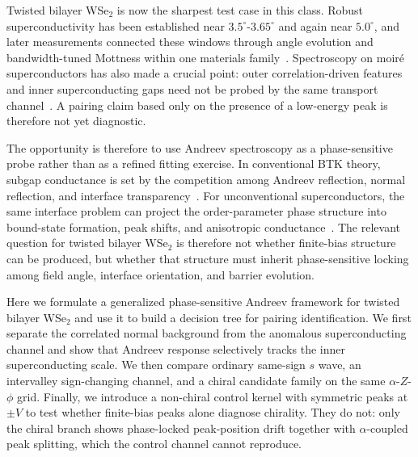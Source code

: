 \documentclass[aps,prl,twocolumn,superscriptaddress,longbibliography]{revtex4-2}
\begin{document}
Twisted bilayer WSe$_2$ is now the sharpest test case in this class. Robust
superconductivity has been established near $3.5^\circ$-$3.65^\circ$ and again
near $5.0^\circ$, and later measurements connected these windows through angle
evolution and bandwidth-tuned Mottness within one materials
family~\cite{Xia2025SC,Hone2025SC5,Angle2026,Bandwidth2026}. Spectroscopy on
moir\'e superconductors has also made a crucial point: outer correlation-driven
features and inner superconducting gaps need not be probed by the same
transport channel~\cite{Kim2026Intervalley}. A pairing claim based only on the
presence of a low-energy peak is therefore not yet diagnostic.

The opportunity is therefore to use Andreev spectroscopy as a phase-sensitive
probe rather than as a refined fitting exercise. In conventional BTK theory,
subgap conductance is set by the competition among Andreev reflection, normal
reflection, and interface transparency~\cite{BTK1982,Octavio1983,Beenakker1997}.
For unconventional superconductors, the same interface problem can project the
order-parameter phase structure into bound-state formation, peak shifts, and
anisotropic conductance~\cite{Hu1994,TanakaKashiwaya1995,KashiwayaTanaka2000,Linder2010,Wu2018Shift,Wang2023STM}.
The relevant question for twisted bilayer WSe$_2$ is therefore not whether
finite-bias structure can be produced, but whether that structure must inherit
phase-sensitive locking among field angle, interface orientation, and barrier
evolution.

Here we formulate a generalized phase-sensitive Andreev framework for twisted
bilayer WSe$_2$ and use it to build a decision tree for pairing
identification. We first separate the correlated normal background from the
anomalous superconducting channel and show that Andreev response selectively
tracks the inner superconducting scale. We then compare ordinary same-sign
$s$ wave, an intervalley sign-changing channel, and a chiral candidate family
on the same $\alpha$-$Z$-$\phi$ grid. Finally, we introduce a non-chiral
control kernel with symmetric peaks at $\pm V$ to test whether finite-bias
peaks alone diagnose chirality. They do not: only the chiral branch shows
phase-locked peak-position drift together with $\alpha$-coupled peak splitting,
which the control channel cannot reproduce.
\end{document}
